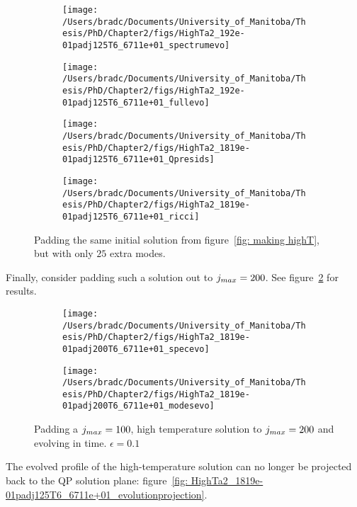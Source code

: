 \documentclass[../PhD.tex]{subfiles}
\begin{document}
\begin{figure}[h]
	\centering
	\begin{subfigure}[t]{0.45\textwidth}
		\texttt{[image: /Users/bradc/Documents/University\_of\_Manitoba/Thesis/PhD/Chapter2/figs/HighTa2\_192e-01padj125T6\_6711e+01\_spectrumevo]}
	\end{subfigure}
	\;
	\begin{subfigure}[t]{0.45\textwidth}
		\texttt{[image: /Users/bradc/Documents/University\_of\_Manitoba/Thesis/PhD/Chapter2/figs/HighTa2\_192e-01padj125T6\_6711e+01\_fullevo]}
	\end{subfigure}
	\;
	\begin{subfigure}[t]{0.45\textwidth}
		\texttt{[image: /Users/bradc/Documents/University\_of\_Manitoba/Thesis/PhD/Chapter2/figs/HighTa2\_1819e-01padj125T6\_6711e+01\_Qpresids]}
	\end{subfigure}
	\;
	\begin{subfigure}[t]{0.45\textwidth}
		\texttt{[image: /Users/bradc/Documents/University\_of\_Manitoba/Thesis/PhD/Chapter2/figs/HighTa2\_1819e-01padj125T6\_6711e+01\_ricci]}
	\end{subfigure}
	\caption{Padding the same initial solution from figure~\ref{fig: making highT}, but with only $25$ extra modes.}
	\label{fig:HighTa2_1819e-01padj125T6_6711e+01_evo}
\end{figure}

Finally, consider padding such a solution out to $j_{max} = 200$. See figure~\ref{fig:HighTa2_1819e-01padj200T6_6711e+01_evo} for results.

\begin{figure}[h]
	\centering
	\begin{subfigure}[t]{0.45\textwidth}
		\texttt{[image: /Users/bradc/Documents/University\_of\_Manitoba/Thesis/PhD/Chapter2/figs/HighTa2\_1819e-01padj200T6\_6711e+01\_specevo]}
	\end{subfigure}
	\;
	\begin{subfigure}[t]{0.45\textwidth}
		\texttt{[image: /Users/bradc/Documents/University\_of\_Manitoba/Thesis/PhD/Chapter2/figs/HighTa2\_1819e-01padj200T6\_6711e+01\_modesevo]}
	\end{subfigure}
	\caption{Padding a $j_{max} = 100$, high temperature solution to $j_{max} = 200$ and evolving in time. $\epsilon = 0.1$}
	\label{fig:HighTa2_1819e-01padj200T6_6711e+01_evo}
\end{figure}

The evolved profile of the high-temperature solution can no longer be projected back to the QP solution plane: figure~\ref{fig: HighTa2_1819e-01padj125T6_6711e+01_evolutionprojection}.
\end{document}
